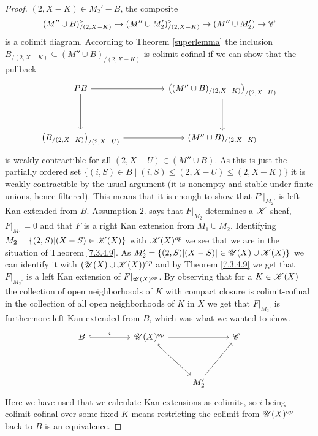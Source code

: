 \documentclass[../../thesis.tex]{subfiles}
\begin{document}
\begin{proof}
    $(2,X-K)\in M_2' - B$, the composite
    \[
        (M'' \cup B)^{\triangleright}_{/(2,X-K)} \hookrightarrow  (M'' \cup M_2')^{\triangleright}_{/(2,X-K)} \to (M''\cup M_2') \to \mathscr{C}
    \]
    is a colimit diagram.
    According to Theorem \ref{superlemma} the inclusion $B_{/(2,X-K)}\subseteq (M''\cup B)_{/(2,X-K)}$ is colimit-cofinal if we can show that the pullback
    \[\begin{tikzcd}
            PB && {\left((M''\cup B)_{/(2,X-K)}\right)_{/(2,X-U)}} \\
            \\
            {\left(B_{/(2,X-K)}\right)_{/(2,X-U)}} && {(M''\cup B)_{/(2,X-K)}}
            \arrow[from=1-1, to=1-3]
            \arrow[from=1-3, to=3-3]
            \arrow[from=3-1, to=3-3]
            \arrow[from=1-1, to=3-1]
        \end{tikzcd}\]
    is weakly contractible for all $(2,X-U) \in (M''\cup B)$.
    As this is just the partially ordered set $\{(i,S)\in B \mid (i,S) \leq (2,X-U) \leq (2,X-K)\}$ it is weakly contractible by the usual argument (it is nonempty and stable under finite unions, hence filtered).
    This means that it is enough to show that $F'|_{M_2'}$ is left Kan extended from $B$.
    Assumption $2.$ says that $F|_{M_2}$ determines a $\mathscr{K}$-sheaf, $F|_{M_1}=0$ and that $F$ is a right Kan extension from $M_1 \cup M_2$.
    Identifying $M_2 = \{(2, S) | (X-S) \in \mathscr{K}(X)\}$ with $\mathscr{K}(X)^{op}$ we see that we are in the situation of Theorem \ref{7.3.4.9}.
    As $M_2' = \{(2,S) | (X-S) | \in \mathscr{U}(X) \cup \mathscr{K}(X)\}$ we can identify it with $(\mathscr{U}(X) \cup \mathscr{K}(X))^{op}$ and by Theorem \ref{7.3.4.9} we get that $F|_{M_2'}$ is a left Kan extension of $F|_{\mathscr{U}(X)^{op}}$.
    By observing that for a $K \in \mathscr{K}(X)$ the collection of open neighborhoods of $K$ with compact closure is colimit-cofinal in the collection of all open neighborhoods of $K$ in $X$ we get that $F|_{M_2'}$ is furthermore left Kan extended from $B$, which was what we wanted to show.
    \[\begin{tikzcd}
            B && {\Open(X)^{op}} && \C \\
            \\
            &&& {M_2'}
            \arrow[hook, from=1-3, to=3-4]
            \arrow[from=1-3, to=1-5]
            \arrow[from=3-4, to=1-5]
            \arrow["i", hook, from=1-1, to=1-3]
        \end{tikzcd}\]
    Here we have used that we calculate Kan extensions as colimits, so $i$ being colimit-cofinal over some fixed $K$ means restricting the colimit from $\mathscr{U}(X)^{op}$ back to $B$ is an equivalence.



\end{proof}
\end{document}
